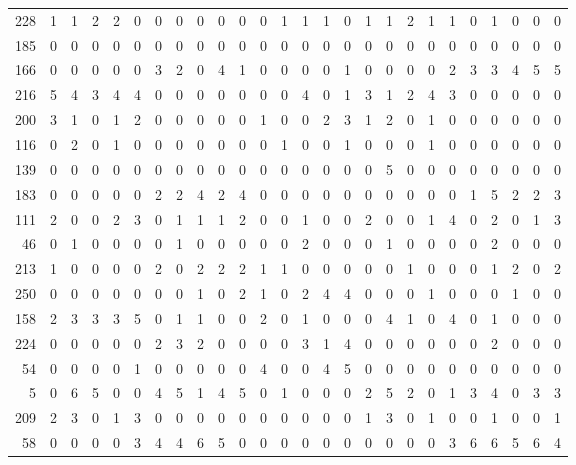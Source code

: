 \begin{longtable}{@{\extracolsep{\fill}}rccccccccccccccccccccccccc@{}}
228 & 1 & 1 & 2 & 2 & 0 & 0 & 0 & 0 & 0 & 0 & 0 & 1 & 1 & 1 & 0 & 1 & 1 & 2 & 1 & 1 & 0 & 1 & 0 & 0 & 0 \\
185 & 0 & 0 & 0 & 0 & 0 & 0 & 0 & 0 & 0 & 0 & 0 & 0 & 0 & 0 & 0 & 0 & 0 & 0 & 0 & 0 & 0 & 0 & 0 & 0 & 0 \\
166 & 0 & 0 & 0 & 0 & 0 & 3 & 2 & 0 & 4 & 1 & 0 & 0 & 0 & 0 & 1 & 0 & 0 & 0 & 0 & 2 & 3 & 3 & 4 & 5 & 5 \\
216 & 5 & 4 & 3 & 4 & 4 & 0 & 0 & 0 & 0 & 0 & 0 & 0 & 4 & 0 & 1 & 3 & 1 & 2 & 4 & 3 & 0 & 0 & 0 & 0 & 0 \\
200 & 3 & 1 & 0 & 1 & 2 & 0 & 0 & 0 & 0 & 0 & 1 & 0 & 0 & 2 & 3 & 1 & 2 & 0 & 1 & 0 & 0 & 0 & 0 & 0 & 0 \\
116 & 0 & 2 & 0 & 1 & 0 & 0 & 0 & 0 & 0 & 0 & 0 & 1 & 0 & 0 & 1 & 0 & 0 & 0 & 1 & 0 & 0 & 0 & 0 & 0 & 0 \\
139 & 0 & 0 & 0 & 0 & 0 & 0 & 0 & 0 & 0 & 0 & 0 & 0 & 0 & 0 & 0 & 0 & 5 & 0 & 0 & 0 & 0 & 0 & 0 & 0 & 0 \\
183 & 0 & 0 & 0 & 0 & 0 & 2 & 2 & 4 & 2 & 4 & 0 & 0 & 0 & 0 & 0 & 0 & 0 & 0 & 0 & 0 & 1 & 5 & 2 & 2 & 3 \\
111 & 2 & 0 & 0 & 2 & 3 & 0 & 1 & 1 & 1 & 2 & 0 & 0 & 1 & 0 & 0 & 2 & 0 & 0 & 1 & 4 & 0 & 2 & 0 & 1 & 3 \\
46 & 0 & 1 & 0 & 0 & 0 & 0 & 1 & 0 & 0 & 0 & 0 & 0 & 2 & 0 & 0 & 0 & 1 & 0 & 0 & 0 & 0 & 2 & 0 & 0 & 0 \\
213 & 1 & 0 & 0 & 0 & 0 & 2 & 0 & 2 & 2 & 2 & 1 & 1 & 0 & 0 & 0 & 0 & 0 & 1 & 0 & 0 & 0 & 1 & 2 & 0 & 2 \\
250 & 0 & 0 & 0 & 0 & 0 & 0 & 0 & 1 & 0 & 2 & 1 & 0 & 2 & 4 & 4 & 0 & 0 & 0 & 1 & 0 & 0 & 0 & 1 & 0 & 0 \\
158 & 2 & 3 & 3 & 3 & 5 & 0 & 1 & 1 & 0 & 0 & 2 & 0 & 1 & 0 & 0 & 0 & 4 & 1 & 0 & 4 & 0 & 1 & 0 & 0 & 0 \\
224 & 0 & 0 & 0 & 0 & 0 & 2 & 3 & 2 & 0 & 0 & 0 & 0 & 3 & 1 & 4 & 0 & 0 & 0 & 0 & 0 & 0 & 2 & 0 & 0 & 0 \\
54 & 0 & 0 & 0 & 0 & 1 & 0 & 0 & 0 & 0 & 0 & 4 & 0 & 0 & 4 & 5 & 0 & 0 & 0 & 0 & 0 & 0 & 0 & 0 & 0 & 0 \\
5 & 0 & 6 & 5 & 0 & 0 & 4 & 5 & 1 & 4 & 5 & 0 & 1 & 0 & 0 & 0 & 2 & 5 & 2 & 0 & 1 & 3 & 4 & 0 & 3 & 3 \\
209 & 2 & 3 & 0 & 1 & 3 & 0 & 0 & 0 & 0 & 0 & 0 & 0 & 0 & 0 & 0 & 1 & 3 & 0 & 1 & 0 & 0 & 1 & 0 & 0 & 1 \\
58 & 0 & 0 & 0 & 0 & 3 & 4 & 4 & 6 & 5 & 0 & 0 & 0 & 0 & 0 & 0 & 0 & 0 & 0 & 0 & 3 & 6 & 6 & 5 & 6 & 4 \\

\end{longtable}
